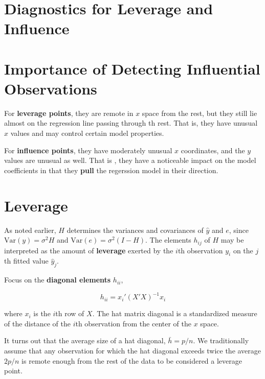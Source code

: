 \documentclass[12pt]{article}
\begin{document}
\pagebreak
\section*{Diagnostics for Leverage and Influence}

\setcounter{section}{0}
\bigskip

\section{Importance of Detecting Influential Observations}

For \textbf{leverage points}, they are remote in $x$ space from the rest, but they still lie almost on the regression line passing through th rest. That is, they have unusual $x$ values and may control certain model properties.

For \textbf{influence points}, they have moderately unusual $x$ coordinates, and the $y$ values are unusual as well. That is , they have a noticeable impact on the model coefficients in that they \textbf{pull} the regerssion model in their direction. 


\section{Leverage}

As noted earlier, $H$ determines the variances and covariances of $\hat{y}$ and $e$, since $\mathrm{Var}(y) = \sigma^2 H$ and $\mathrm{Var}(e) = \sigma^2(I - H)$. The elements $h_{ij}$ of $H$ may be interpreted as the amount of \textbf{leverage} exerted by the $i$th observation $y_i$ on the $j$th fitted value $\hat{y}_j$. 

Focus on the \textbf{diagonal elements} $h_{ii}$, 

$$
h_{ii} = x_i' (X'X)^{-1} x_i
$$

where $x_i$ is the $i$th row of $X$. The hat matrix diagonal is a standardized measure of the distance of the $i$th observation from the center of the $x$ space.

It turns out that the average size of a hat diagonal, $\bar{h} = p/n$. We traditionally assume that any observation for which the hat diagonal exceeds twice the average $2p/n$ is remote enough from the rest of the data to be considered a leverage point.
\end{document}

